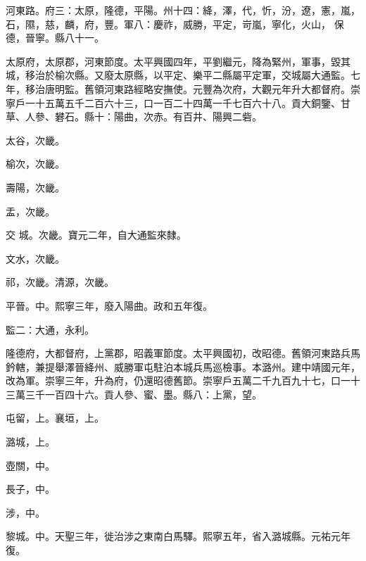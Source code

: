 \begin{pinyinscope}
 河東路。府三：太原，隆德，平陽。州十四：絳，澤，代，忻，汾，遼，憲，嵐，石，隰，慈，麟，府，豐。軍八：慶祚，威勝，平定，岢嵐，寧化，火山，
 保德，晉寧。縣八十一。



 太原府，太原郡，河東節度。太平興國四年，平劉繼元，降為緊州，軍事，毀其城，移治於榆次縣。又廢太原縣，以平定、樂平二縣屬平定軍，交城屬大通監。七年，移治唐明監。舊領河東路經略安撫使。元豐為次府，大觀元年升大都督府。崇寧戶一十五萬五千二百六十三，口一百二十四萬一千七百六十八。貢大銅鑒、甘草、人參、礬石。縣十：陽曲，次赤。有百井、陽興二砦。



 太谷，次畿。



 榆次，次畿。



 壽陽，次畿。



 盂，次畿。



 交
 城。次畿。寶元二年，自大通監來隸。



 文水，次畿。



 祁，次畿。清源，次畿。



 平晉。中。熙寧三年，廢入陽曲。政和五年復。



 監二：大通，永利。



 隆德府，大都督府，上黨郡，昭義軍節度。太平興國初，改昭德。舊領河東路兵馬鈐轄，兼提舉澤晉絳州、威勝軍屯駐泊本城兵馬巡檢事。本潞州。建中靖國元年，改為軍。崇寧三年，升為府，仍還昭德舊節。崇寧戶五萬二千九百九十七，口一十三萬三千一百四十六。貢人參、蜜、墨。縣八：上黨，望。



 屯留，上。襄垣，上。



 潞城，上。



 壺關，中。



 長子，中。



 涉，中。



 黎城。中。天聖三年，徙治涉之東南白馬驛。熙寧五年，省入潞城縣。元祐元年復。




\end{pinyinscope}
